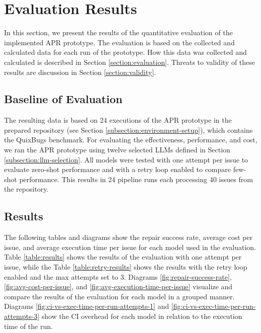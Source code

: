 \section{Evaluation Results} \label{section:evaluation-results}

In this section, we present the results of the quantitative evaluation of the implemented APR prototype. The evaluation is based on the collected and calculated data for each run of the prototype. How this data was collected and calculated is described in Section \ref{section:evaluation}. Threats to validity of these results are discussion in Section \ref{section:validity}.

\subsection{Baseline of Evaluation}

The resulting data is based on 24 executions of the APR prototype in the prepared repository (see Section \ref{subsection:environment-setup}), which contains the QuixBugs benchmark. For evaluating the effectiveness, performance, and cost, we ran the APR prototype using twelve selected \acp{LLM} defined in Section \ref{subsection:llm-selection}. All models were tested with one attempt per issue to evaluate zero-shot performance and with a retry loop enabled to compare few-shot performance. This results in 24 pipeline runs each processing 40 issues from the repository.

\subsection{Results}

The following tables and diagrams show the repair success rate, average cost per issue, and average execution time per issue for each model used in the evaluation. Table \ref{table:results} shows the results of the evaluation with one attempt per issue, while the Table \ref{table:retry-results} shows the results with the retry loop enabled and the max attempts set to 3. Diagrams \ref{fig:repair-success-rate}, \ref{fig:avg-cost-per-issue}, and \ref{fig:avg-execution-time-per-issue} visualize and compare the results of the evaluation for each model in a grouped manner. Diagrams \ref{fig:ci-vs-exec-time-per-run-attempts-1} and \ref{fig:ci-vs-exec-time-per-run-attempts-3} show the CI overhead for each model in relation to the execution time of the run. 

